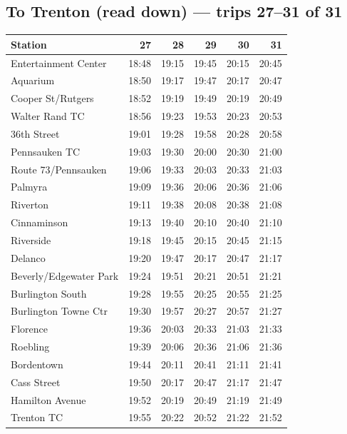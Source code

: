 \subsection*{To Trenton (read down) --- trips 27--31 of 31}
\begin{center}\footnotesize\setlength{\tabcolsep}{3pt}\begin{tabular}{@{}lrrrrr@{}}\toprule
Station & 27 & 28 & 29 & 30 & 31 \\\midrule
Entertainment Center & 18:48 & 19:15 & 19:45 & 20:15 & 20:45 \\
Aquarium & 18:50 & 19:17 & 19:47 & 20:17 & 20:47 \\
Cooper St/Rutgers & 18:52 & 19:19 & 19:49 & 20:19 & 20:49 \\
Walter Rand TC & 18:56 & 19:23 & 19:53 & 20:23 & 20:53 \\
36th Street & 19:01 & 19:28 & 19:58 & 20:28 & 20:58 \\
Pennsauken TC & 19:03 & 19:30 & 20:00 & 20:30 & 21:00 \\
Route 73/Pennsauken & 19:06 & 19:33 & 20:03 & 20:33 & 21:03 \\
Palmyra & 19:09 & 19:36 & 20:06 & 20:36 & 21:06 \\
Riverton & 19:11 & 19:38 & 20:08 & 20:38 & 21:08 \\
Cinnaminson & 19:13 & 19:40 & 20:10 & 20:40 & 21:10 \\
Riverside & 19:18 & 19:45 & 20:15 & 20:45 & 21:15 \\
Delanco & 19:20 & 19:47 & 20:17 & 20:47 & 21:17 \\
Beverly/Edgewater Park & 19:24 & 19:51 & 20:21 & 20:51 & 21:21 \\
Burlington South & 19:28 & 19:55 & 20:25 & 20:55 & 21:25 \\
Burlington Towne Ctr & 19:30 & 19:57 & 20:27 & 20:57 & 21:27 \\
Florence & 19:36 & 20:03 & 20:33 & 21:03 & 21:33 \\
Roebling & 19:39 & 20:06 & 20:36 & 21:06 & 21:36 \\
Bordentown & 19:44 & 20:11 & 20:41 & 21:11 & 21:41 \\
Cass Street & 19:50 & 20:17 & 20:47 & 21:17 & 21:47 \\
Hamilton Avenue & 19:52 & 20:19 & 20:49 & 21:19 & 21:49 \\
Trenton TC & 19:55 & 20:22 & 20:52 & 21:22 & 21:52 \\
\bottomrule\end{tabular}\end{center}
